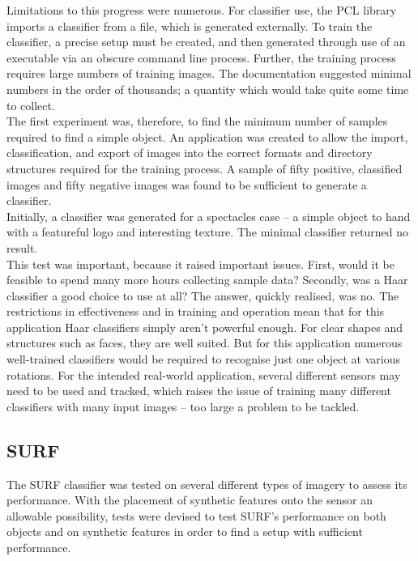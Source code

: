 Limitations to this progress were numerous. For classifier use, the PCL library imports a classifier from a file, which is generated externally. To train the classifier, a precise setup must be created, and then generated through use of an executable via an obscure command line process. Further, the training process requires large numbers of training images. The documentation suggested minimal numbers in the order of thousands; a quantity which would take quite some time to collect.\\

The first experiment was, therefore, to find the minimum number of samples required to find a simple object. An application was created to allow the import, classification, and export of images into the correct formats and directory structures required for the training process. A sample of fifty positive, classified images and fifty negative images was found to be sufficient to generate a classifier.\\
Initially, a classifier was generated for a spectacles case – a simple object to hand with a featureful logo and interesting texture. The minimal classifier returned no result.\\
 
This test was important, because it raised important issues. First, would it be feasible to spend many more hours collecting sample data?  Secondly, was a Haar classifier a good choice to use at all? The answer, quickly realised, was no. The restrictions in effectiveness and in training and operation mean that for this application Haar classifiers simply aren’t powerful enough. For clear shapes and structures such as faces, they are well suited. But for this application numerous well-trained classifiers would be required to recognise just one object at various rotations. For the intended real-world application, several different sensors may need to be used and tracked, which raises the issue of training many different classifiers with many input images – too large a problem to be tackled.\\


\subsection{SURF}
The SURF classifier was tested on several different types of imagery to assess its performance. With the placement of synthetic features onto the sensor an allowable possibility, tests were devised to test SURF’s performance on both objects and on synthetic features in order to find a setup with sufficient performance.\\

